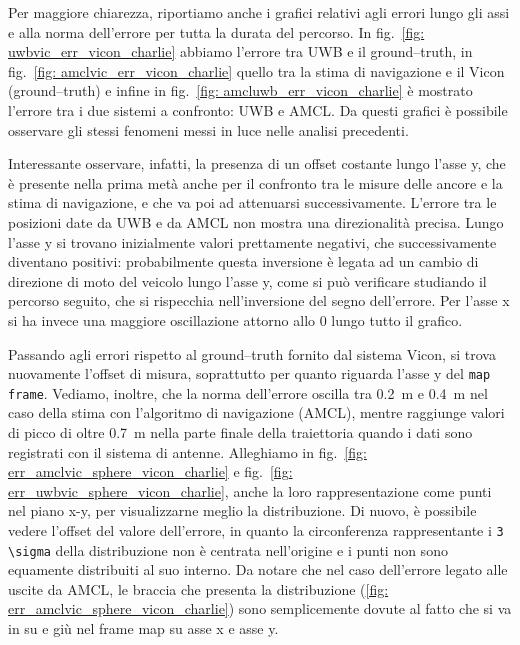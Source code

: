 \vspace{0.5cm}
Per maggiore chiarezza, riportiamo anche i grafici relativi agli errori lungo gli assi e alla norma dell'errore per tutta la durata del percorso. 
In fig.~\ref{fig: uwbvic_err_vicon_charlie} abbiamo l'errore tra UWB e il ground--truth, in fig.~\ref{fig: amclvic_err_vicon_charlie} quello tra la stima di navigazione e il Vicon (ground--truth) e infine in fig.~\ref{fig: amcluwb_err_vicon_charlie} è mostrato l'errore tra i due sistemi a confronto: UWB e AMCL. 
Da questi grafici è possibile osservare gli stessi fenomeni messi in luce nelle analisi precedenti. 

Interessante osservare, infatti, la presenza di un offset costante lungo l'asse y, che è presente nella prima metà anche per il confronto tra le misure delle ancore e la stima di navigazione, e che va poi ad attenuarsi successivamente.
L'errore tra le posizioni date da UWB e da AMCL non mostra una direzionalità precisa. 
Lungo l'asse y si trovano inizialmente valori prettamente negativi, che successivamente diventano positivi: probabilmente questa inversione è legata ad un cambio di direzione di moto del veicolo lungo l'asse y, come si può verificare studiando il percorso seguito, che si rispecchia nell'inversione del segno dell'errore. 
Per l'asse x si ha invece una maggiore oscillazione attorno allo 0 lungo tutto il grafico.

\vspace{0.5cm}
Passando agli errori rispetto al ground--truth fornito dal sistema Vicon, si trova nuovamente l'offset di misura, soprattutto per quanto riguarda l'asse y del \verb|map frame|. Vediamo, inoltre, che la norma dell'errore oscilla tra \SI{0.2}{\metre} e \SI{0.4}{\metre} nel caso della stima con l'algoritmo di navigazione (AMCL), mentre raggiunge valori di picco di oltre \SI{0.7}{\metre } nella parte finale della traiettoria quando i dati sono registrati con il sistema di antenne.
Alleghiamo in fig.~\ref{fig: err_amclvic_sphere_vicon_charlie} e fig.~\ref{fig: err_uwbvic_sphere_vicon_charlie}, anche la loro rappresentazione come punti nel piano x-y, per visualizzarne meglio la distribuzione. Di nuovo, è possibile vedere l'offset del valore dell'errore, in quanto la circonferenza rappresentante i \verb|3 \sigma| della distribuzione non è centrata nell'origine e i punti non sono equamente distribuiti al suo interno. 
Da notare che nel caso dell'errore legato alle uscite da AMCL, le braccia che presenta la distribuzione (\ref{fig: err_amclvic_sphere_vicon_charlie}) sono semplicemente dovute al fatto che si va in su e giù nel frame map su asse x e asse y.


